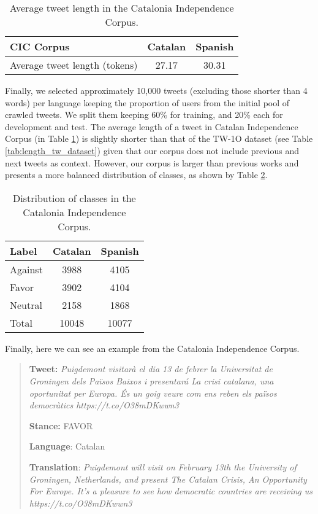\documentclass[10pt, a4paper]{article}
\begin{document}
\begin{table}[!ht]
\centering
\begin{tabular}{lcc} \hline
CIC Corpus & Catalan & Spanish \\ \hline
Average tweet length (tokens)& 27.17 & 30.31 \\ \hline
\end{tabular}
\caption{Average tweet length in the Catalonia Independence Corpus.}\label{tab:length_ind_dataset}
\end{table}

Finally, we selected approximately 10,000 tweets (excluding those shorter than 4 words) per language keeping the proportion of users from the initial pool of crawled tweets. We split them keeping 60\% for training, and 20\% each for development and test. The average length of a tweet in Catalan Independence Corpus (in Table \ref{tab:length_ind_dataset}) is slightly shorter than that of the TW-1O dataset (see Table \ref{tab:length_tw_dataset}) given that our corpus does not include previous and next tweets as context. However, our corpus is larger than previous works \cite{mohammad-etal-2016-semeval,taule18} and presents a more balanced distribution of classes, as shown by Table \ref{tab:distr_dataset}.

\begin{table}[!ht]
\centering
\begin{tabular}{lcc}\hline
Label & Catalan & Spanish \\ \hline
Against & 3988 & 4105 \\
Favor & 3902 & 4104 \\
Neutral & 2158 & 1868 \\ \hline
Total & 10048 & 10077 \\ \hline
\end{tabular}
\caption{Distribution of classes in the Catalonia Independence Corpus.}\label{tab:distr_dataset}
\end{table}

Finally, here we can see an example from the Catalonia Independence Corpus.

\begin{quote}
\textbf{Tweet:} \textit{Puigdemont visitar\`a el dia 13 de febrer la Universitat de Groningen dels Pa\"isos Baixos i presentar\'a  La crisi catalana, una oportunitat per Europa. \'Es un goig veure com ens reben els pa\"isos democr\`atics https://t.co/O38mDKwwn3}

\textbf{Stance:} FAVOR

\textbf{Language}: Catalan

\textbf{Translation}: \textit{Puigdemont will visit
on February 13th the University of Groningen, Netherlands, and present The Catalan Crisis, An Opportunity For Europe.
It's a pleasure to see how democratic countries are receiving us https://t.co/O38mDKwwn3}
\end{quote}
\end{document}
